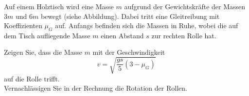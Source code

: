 \begin{ExerciseBlock}
Auf einem Holztisch wird eine Masse $m$ aufgrund der Gewichtskräfte der Massen $3m$ und $6m$ bewegt (siehe Abbildung). Dabei tritt eine Gleitreibung mit Koeffizienten $\mu_G$ auf. Anfangs befinden sich die Massen in Ruhe, wobei die auf dem Tisch aufliegende Masse $m$ einen Abstand $s$ zur rechten Rolle hat.

\begin{center}
\end{center}

Zeigen Sie, dass die Masse $m$ mit der Geschwindigkeit \[v = \sqrt{\frac{gs}{5} \left( 3 - \mu_G\right)} \] auf die Rolle trifft. \\
Vernachlässigen Sie in der Rechnung die Rotation der Rollen.
\end{ExerciseBlock}
